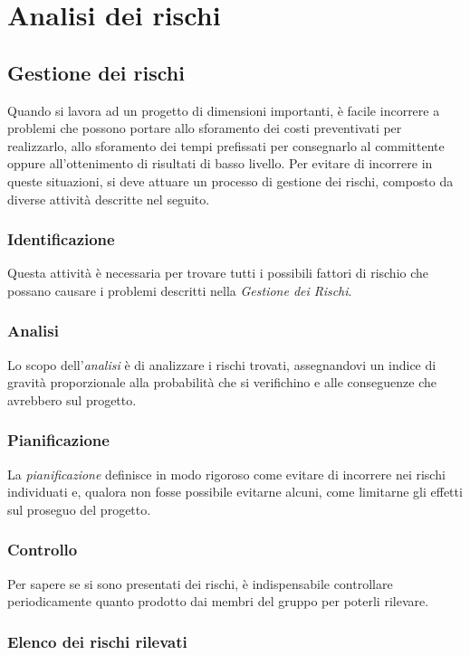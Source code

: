 \section{Analisi dei rischi}
	\subsection{Gestione dei rischi}
Quando si lavora ad un progetto di dimensioni importanti, è facile incorrere a problemi che possono portare allo sforamento dei costi preventivati per realizzarlo, allo sforamento dei tempi prefissati per consegnarlo al committente oppure all'ottenimento di risultati di basso livello. \newline
Per evitare di incorrere in queste situazioni, si deve attuare un processo di gestione dei rischi, composto da diverse attività descritte nel seguito.

	\subsubsection{Identificazione}
Questa attività è necessaria per trovare tutti i possibili fattori di rischio che possano causare i problemi descritti nella \textit{Gestione dei Rischi}.

	\subsubsection{Analisi}
	 Lo scopo dell'\textit{analisi} è di analizzare i rischi trovati, assegnandovi un indice di gravità proporzionale alla probabilità che si verifichino e alle conseguenze che avrebbero sul progetto.

	\subsubsection{Pianificazione}
La \textit{pianificazione} definisce in modo rigoroso come evitare di incorrere nei rischi individuati e, qualora non fosse possibile evitarne alcuni, come limitarne gli effetti sul proseguo del progetto.

	\subsubsection{Controllo} 
 Per sapere se si sono presentati dei rischi, è indispensabile controllare periodicamente quanto prodotto dai membri del gruppo per poterli rilevare.

	\newpage
		
\subsubsection{Elenco dei rischi rilevati}

